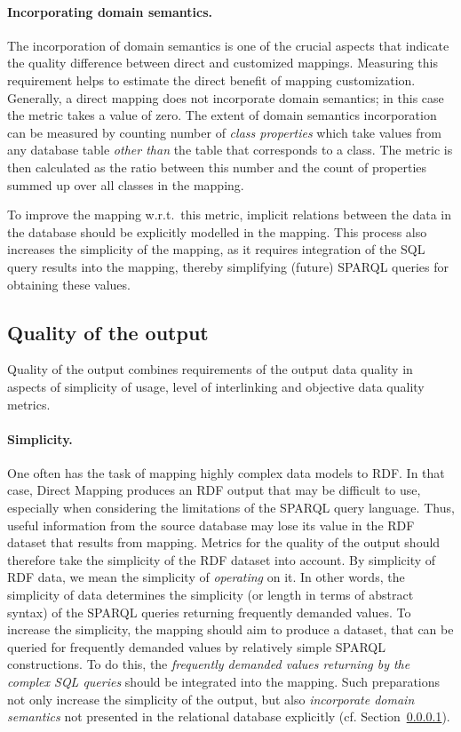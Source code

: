 \paragraph{Incorporating domain semantics.}
\label{par:dom_semantic}

The incorporation of domain semantics is one of the crucial aspects that indicate the quality difference between direct and customized mappings. 
Measuring this requirement helps to estimate the direct benefit of mapping customization.
Generally, a direct mapping does not incorporate domain semantics; in this case the metric takes a value of zero. 
The extent of domain semantics incorporation can be measured by counting number of \emph{class properties} which take values from any database table \emph{other than} the table that corresponds to a class.
The metric is then calculated as the ratio between this number and the  count of properties summed up over all classes in the mapping.

To improve the mapping w.r.t.\ this metric, implicit relations between the data in the database should be explicitly modelled in the mapping.
This process also increases the simplicity of the mapping, as it requires integration of the SQL query results into the mapping, thereby simplifying (future) SPARQL queries for obtaining these values. 

\subsection{Quality of the output}

Quality of the output combines requirements of the output data quality in aspects of simplicity of usage, level of interlinking and objective data quality metrics.

\paragraph{Simplicity.}
One often has the task of mapping highly complex data models to RDF.
In that case, Direct Mapping produces an RDF output that may be difficult to use, especially when considering the limitations of the SPARQL query language.
Thus, useful information from the source database may lose its value in the RDF dataset that results from mapping.
Metrics for the quality of the output should therefore take the simplicity of the RDF dataset into account.
By simplicity of RDF data, we mean the simplicity of \emph{operating} on it.
In other words, the simplicity of data determines the simplicity (or length in terms of abstract syntax) of the SPARQL queries returning frequently demanded values.  
To increase the simplicity, the mapping should aim to produce a dataset, that can be queried for frequently demanded values by relatively simple SPARQL constructions. 
To do this, the \emph{frequently demanded values returning by the complex SQL queries} should be integrated into the mapping.
Such preparations not only increase the simplicity of the output, but also \emph{incorporate domain semantics} not presented in the relational database explicitly (cf. Section~\ref{par:dom_semantic}).

